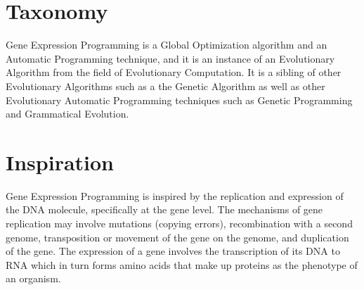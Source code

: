 \documentclass[a4paper, 11pt]{article}
\begin{document}
\section{Taxonomy}
\label{sec:taxonomy}
Gene Expression Programming is a Global Optimization algorithm and an Automatic Programming technique, and it is an instance of an Evolutionary Algorithm from the field of Evolutionary Computation.
It is a sibling of other Evolutionary Algorithms such as a the Genetic Algorithm as well as other Evolutionary Automatic Programming techniques such as Genetic Programming and Grammatical Evolution.

\section{Inspiration}
\label{sec:inspiration}
Gene Expression Programming is inspired by the replication and expression of the DNA molecule, specifically at the gene level. 
The mechanisms of gene replication may involve mutations (copying errors), recombination with a second genome, transposition or movement of the gene on the genome, and duplication of the gene.
The expression of a gene involves the transcription of its DNA to RNA which in turn forms amino acids that make up proteins as the phenotype of an organism. 
\end{document}
